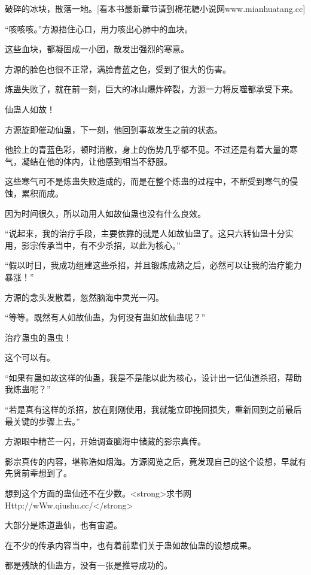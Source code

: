 
\begin{this_body}

破碎的冰块，散落一地。[看本书最新章节请到棉花糖小说网www.mianhuatang.cc]

“咳咳咳。”方源捂住心口，用力咳出心肺中的血块。

这些血块，都凝固成一小团，散发出强烈的寒意。

方源的脸色也很不正常，满脸青蓝之色，受到了很大的伤害。

炼蛊失败了，就在前一刻，巨大的冰山爆炸碎裂，方源一力将反噬都承受下来。

仙蛊人如故！

方源旋即催动仙蛊，下一刻，他回到事故发生之前的状态。

他脸上的青蓝色彩，顿时消散，身上的伤势几乎都不见。不过还是有着大量的寒气，凝结在他的体内，让他感到相当不舒服。

这些寒气可不是炼蛊失败造成的，而是在整个炼蛊的过程中，不断受到寒气的侵蚀，累积而成。

因为时间很久，所以动用人如故仙蛊也没有什么良效。

“说起来，我的治疗手段，主要依靠的就是人如故仙蛊了。这只六转仙蛊十分实用，影宗传承当中，有不少杀招，以此为核心。”

“假以时日，我成功组建这些杀招，并且锻炼成熟之后，必然可以让我的治疗能力暴涨！”

方源的念头发散着，忽然脑海中灵光一闪。

“等等。既然有人如故仙蛊，为何没有蛊如故仙蛊呢？”

治疗蛊虫的蛊虫！

这个可以有。

“如果有蛊如故这样的仙蛊，我是不是能以此为核心，设计出一记仙道杀招，帮助我炼蛊呢？”

“若是真有这样的杀招，放在刚刚使用，我就能立即挽回损失，重新回到之前最后最关键的步骤上去。”

方源眼中精芒一闪，开始调查脑海中储藏的影宗真传。

影宗真传的内容，堪称浩如烟海。方源阅览之后，竟发现自己的这个设想，早就有先贤前辈想到了。

想到这个方面的蛊仙还不在少数。<strong>求书网Http://wWw.qiushu.cc/</strong>

大部分是炼道蛊仙，也有宙道。

在不少的传承内容当中，也有着前辈们关于蛊如故仙蛊的设想成果。

都是残缺的仙蛊方，没有一张是推导成功的。


\end{this_body}
